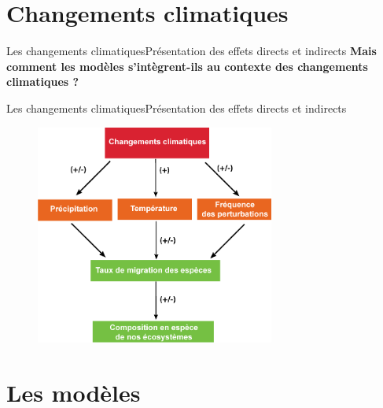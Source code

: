 \documentclass{eecslides}
\begin{document}
\section{Changements climatiques}

	\begin{frame}{Les changements climatiques}{Présentation des effets directs et indirects}
		\textbf{\alert{Mais comment les modèles s'intègrent-ils au contexte des changements climatiques ?}}
	\end{frame}

	\begin{frame}[t]{Les changements climatiques}{Présentation des effets directs et indirects}
	\vspace{-0.5cm}
		\begin{figure}
			\includegraphics[width=0.7\textwidth]{CCscheme1.png} 
		\end{figure}    
	
	\end{frame}


	\section{Les modèles}
\end{document}
